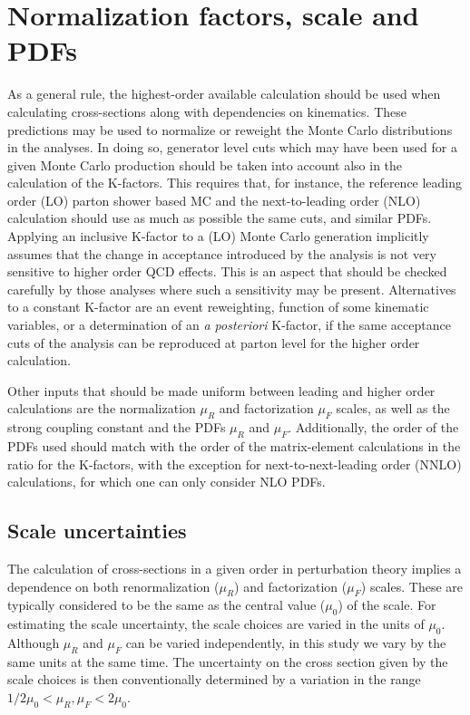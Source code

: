\section{Normalization factors, scale and PDFs}
\label{sec:normalization}
As a general rule, the highest-order available calculation should be used when 
calculating cross-sections along with dependencies on kinematics. These predictions
may be used to normalize or reweight the Monte Carlo distributions in the analyses.
In doing so, generator level cuts which may have been used for a given Monte Carlo 
production should be taken into account also in the calculation of the K-factors. 
This requires that, for instance, the 
reference leading order (LO) parton shower based MC and the next-to-leading order 
(NLO) calculation should use as much as possible the same cuts, and similar PDFs. 
Applying an inclusive K-factor to a (LO) Monte Carlo generation implicitly assumes
that the change in acceptance introduced by the analysis is not very sensitive 
to higher order QCD effects. This is an aspect that should be checked carefully
by those analyses where such a sensitivity may be present. Alternatives to a
constant K-factor are an event reweighting, function of some kinematic variables, 
or a determination of an {\it a posteriori} K-factor, if the same acceptance cuts 
of the analysis can be reproduced at parton level for the higher order calculation.

Other inputs that should be made uniform between leading and higher order 
calculations are the normalization $\mu_R$ and factorization $\mu_F$ scales,
as well as the strong coupling constant and the PDFs $\mu_R$ and $\mu_F$. 
Additionally, the order of the PDFs used should match with the order of the 
matrix-element calculations in the ratio for the K-factors, with the exception 
for next-to-next-leading order (NNLO) calculations, for which one can only 
consider NLO PDFs. 

\subsection{Scale uncertainties}
\label{kf}

The calculation of cross-sections in a given order in perturbation theory 
implies a dependence on both renormalization ($\mu_R$) and factorization 
($\mu_F$) scales. These are typically considered to be the same as the central 
value ($\mu_0$) of the scale.  For estimating the scale uncertainty, the scale 
choices are varied in the units of $\mu_0$. Although $\mu_R$ and $\mu_F$ can 
be varied independently, in this study we vary by the same units at the same 
time. The uncertainty on the cross section given by the scale choices is
then conventionally determined by a variation in the range
$1/2 \mu_0 < \mu_R, \mu_F < 2\mu_0$. 

